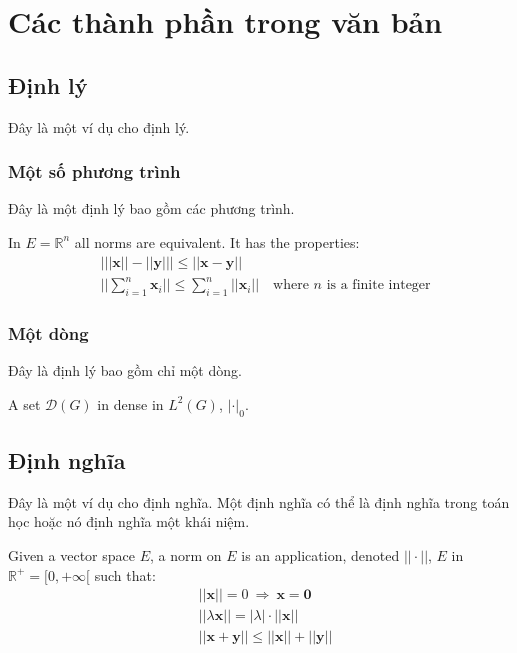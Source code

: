 \documentclass[11pt,fleqn]{book} %
\begin{document}
\chapter{Các thành phần trong văn bản}

\section{Định lý}

Đây là một ví dụ cho định lý.

\subsection{Một số phương trình}

Đây là một định lý bao gồm các phương trình.

\begin{theorem}
In $E=\mathbb{R}^n$ all norms are equivalent. It has the properties:
\begin{align}
& \big| ||\mathbf{x}|| - ||\mathbf{y}|| \big|\leq || \mathbf{x}- \mathbf{y}||\\
&  ||\sum_{i=1}^n\mathbf{x}_i||\leq \sum_{i=1}^n||\mathbf{x}_i||\quad\text{where $n$ is a finite integer}
\end{align}
\end{theorem}

\subsection{Một dòng}

Đây là định lý bao gồm chỉ một dòng.

\begin{theorem}
A set $\mathcal{D}(G)$ in dense in $L^2(G)$, $|\cdot|_0$. 
\end{theorem}


\section{Định nghĩa}

Đây là một ví dụ cho định nghĩa. Một định nghĩa có thể là định nghĩa trong toán học hoặc nó định nghĩa một khái niệm.

\begin{definition}
Given a vector space $E$, a norm on $E$ is an application, denoted $||\cdot||$, $E$ in $\mathbb{R}^+=[0,+\infty[$ such that:
\begin{align}
& ||\mathbf{x}||=0\ \Rightarrow\ \mathbf{x}=\mathbf{0}\\
& ||\lambda \mathbf{x}||=|\lambda|\cdot ||\mathbf{x}||\\
& ||\mathbf{x}+\mathbf{y}||\leq ||\mathbf{x}||+||\mathbf{y}||
\end{align}
\end{definition}
\end{document}
